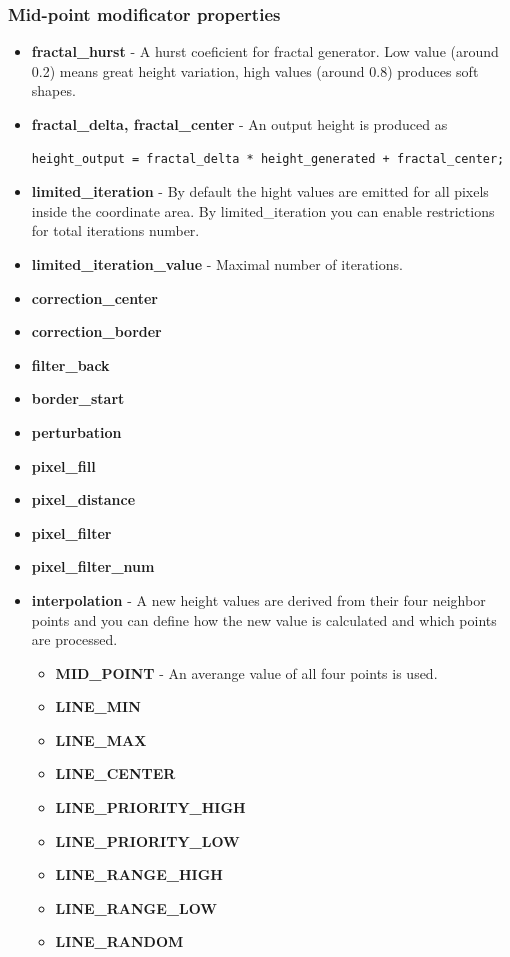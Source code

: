 \documentclass[9pt]{article}
\begin{document}
\subsubsection*{Mid-point modificator properties}
\begin{itemize}
\item{\bf fractal\_hurst} - A hurst coeficient for fractal generator. Low value 
(around 0.2) means great height variation, high values (around 0.8) produces soft shapes.
\item{\bf fractal\_delta, fractal\_center} - An output height is produced as
\begin{verbatim}
height_output = fractal_delta * height_generated + fractal_center;
\end{verbatim}
\item{\bf limited\_iteration} - By default the hight values are emitted for all pixels
inside the coordinate area. By limited\_iteration you can enable restrictions 
for total iterations number.
\item{\bf limited\_iteration\_value} - Maximal number of iterations.
\item{\bf correction\_center}
\item{\bf correction\_border}
\item{\bf filter\_back}
\item{\bf border\_start}
\item{\bf perturbation}
\item{\bf pixel\_fill}
\item{\bf pixel\_distance}
\item{\bf pixel\_filter}
\item{\bf pixel\_filter\_num}
\item{\bf interpolation} - A new height values are derived
from their four neighbor points and you can define how the new value is calculated
and which points are processed. 
\begin{itemize}
\item{\bf MID\_POINT} - An averange value of all four points is used.
\item{\bf LINE\_MIN}
\item{\bf LINE\_MAX}
\item{\bf LINE\_CENTER}
\item{\bf LINE\_PRIORITY\_HIGH}
\item{\bf LINE\_PRIORITY\_LOW}
\item{\bf LINE\_RANGE\_HIGH}
\item{\bf LINE\_RANGE\_LOW}
\item{\bf LINE\_RANDOM}

\end{itemize}
\end{itemize}
\end{document}
